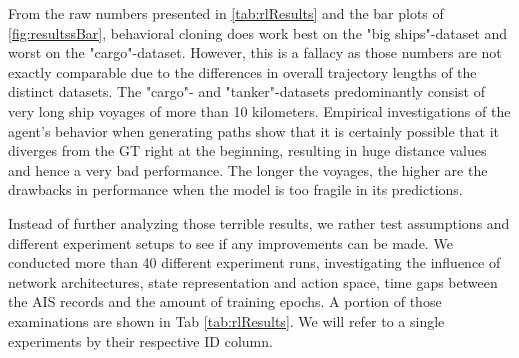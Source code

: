 From the raw numbers presented in \ref{tab:rlResults} and the bar plots of \ref{fig:resultssBar}, behavioral cloning does work best on the "big ships"-dataset and worst on the "cargo"-dataset. However, this is a fallacy as those numbers are not exactly comparable due to the differences in overall trajectory lengths of the distinct datasets. The "cargo"- and "tanker"-datasets predominantly consist of very long ship voyages of more than 10 kilometers. Empirical investigations of the agent's behavior when generating paths show that it is certainly possible that it diverges from the GT right at the beginning, resulting in huge distance values and hence a very bad performance. The longer the voyages, the higher are the drawbacks in performance when the model is too fragile in its predictions.
\par
Instead of further analyzing those terrible results, we rather test assumptions and different experiment setups to see if any improvements can be made. We conducted more than 40 different experiment runs, investigating the influence of network architectures, state representation and action space, time gaps between the AIS records and the amount of training epochs. A portion of those examinations are shown in Tab \ref{tab:rlResults}. We will refer to a single experiments by their respective ID column.
